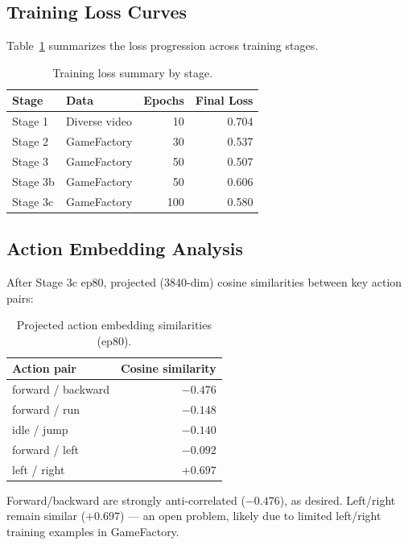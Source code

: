 \documentclass[10pt,twocolumn]{article}
\begin{document}
\subsection{Training Loss Curves}

Table~\ref{tab:loss} summarizes the loss progression across training stages.

\begin{table}[h]
\centering
\small
\caption{Training loss summary by stage.}
\label{tab:loss}
\begin{tabular}{llrr}
\toprule
Stage & Data & Epochs & Final Loss \\
\midrule
Stage 1 & Diverse video & 10 & 0.704 \\
Stage 2 & GameFactory & 30 & 0.537 \\
Stage 3 & GameFactory & 50 & 0.507 \\
Stage 3b & GameFactory & 50 & 0.606 \\
Stage 3c & GameFactory & 100 & 0.580 \\
\bottomrule
\end{tabular}
\end{table}

\subsection{Action Embedding Analysis}

After Stage 3c ep80, projected (3840-dim) cosine similarities between key action pairs:

\begin{table}[h]
\centering
\small
\caption{Projected action embedding similarities (ep80).}
\label{tab:embeddings}
\begin{tabular}{lr}
\toprule
Action pair & Cosine similarity \\
\midrule
forward / backward & $-0.476$ \\
forward / run & $-0.148$ \\
idle / jump & $-0.140$ \\
forward / left & $-0.092$ \\
left / right & $+0.697$ \\
\bottomrule
\end{tabular}
\end{table}

Forward/backward are strongly anti-correlated ($-0.476$), as desired. Left/right remain similar ($+0.697$) --- an open problem, likely due to limited left/right training examples in GameFactory.
\end{document}
